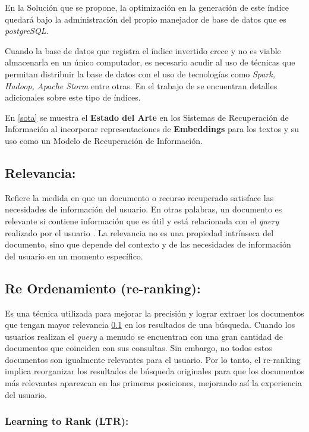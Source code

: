 \documentclass[
  12pt,
  openany]{book}
\begin{document}
En la Solución que se propone, la optimización en la generación de este índice quedará bajo la administración del propio manejador de base de datos que es \emph{postgreSQL}.

Cuando la base de datos que registra el índice invertido crece y no es viable almacenarla en un único computador, es necesario acudir al uso de técnicas que permitan distribuir la base de datos con el uso de tecnologías como \emph{Spark, Hadoop, Apache Storm} entre otras. En el trabajo de \citep{Mahapatra2011} se encuentran detalles adicionales sobre este tipo de índices.

En \ref{sota} se muestra el \textbf{Estado del Arte} en los Sistemas de Recuperación de Información al incorporar representaciones de \textbf{Embeddings} \citep{reimers2019} para los textos y su uso como un Modelo de Recuperación de Información.

\hypertarget{relevancia}{%
\subsection{Relevancia:}\label{relevancia}}

Refiere la medida en que un documento o recurso recuperado satisface las necesidades de información del usuario. En otras palabras, un documento es relevante si contiene información que es útil y está relacionada con el \emph{query} realizado por el usuario \citep{büttcher2010a}. La relevancia no es una propiedad intrínseca del documento, sino que depende del contexto y de las necesidades de información del usuario en un momento específico.

\hypertarget{ranking}{%
\subsection{Re Ordenamiento (re-ranking):}\label{ranking}}

Es una técnica utilizada para mejorar la precisión y lograr extraer los documentos que tengan mayor relevancia \ref{relevancia} en los resultados de una búsqueda. Cuando los usuarios realizan el \emph{query} a menudo se encuentran con una gran cantidad de documentos que coinciden con sus consultas. Sin embargo, no todos estos documentos son igualmente relevantes para el usuario. Por lo tanto, el re-ranking implica reorganizar los resultados de búsqueda originales para que los documentos más relevantes aparezcan en las primeras posiciones, mejorando así la experiencia del usuario.

\hypertarget{learning-to-rank-ltr}{%
\subsubsection{Learning to Rank (LTR):}\label{learning-to-rank-ltr}}
\end{document}
